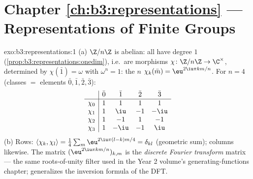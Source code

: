 \section*{Chapter \ref{ch:b3:representations} --- Representations
of Finite Groups}

\begin{solution}{exo:b3:representations:1}
(a) $\Z/n\Z$ is abelian: all  have degree $1$
(\cref{prop:b3:representations:onedim}), i.e.\ are morphisms
$\chi \colon \Z/n\Z \to \C^\times$, determined by $\chi(\bar 1)
= \omega$ with $\omega^n = 1$: the $n$  $\chi_k(\bar
m) = \eu^{2\iu\pi km/n}$. For $n = 4$ (classes $= $ elements
$\bar0,\bar1,\bar2,\bar3$):
\[
\begin{array}{c|cccc}
& \bar0 & \bar1 & \bar2 & \bar3\\
\hline
\chi_0 & 1 & 1 & 1 & 1\\
\chi_1 & 1 & \iu & -1 & -\iu\\
\chi_2 & 1 & -1 & 1 & -1\\
\chi_3 & 1 & -\iu & -1 & \iu
\end{array}
\]
(b) Rows: $\langle\chi_k,\chi_l\rangle = \frac14\sum_m
\eu^{2\iu\pi(l-k)m/4} = \delta_{kl}$ (geometric sum); columns
likewise. The matrix $(\eu^{2\iu\pi km/n})_{k,m}$ is the
\emph{discrete Fourier transform} matrix --- the same
roots-of-unity filter used in the Year 2 volume's
generating-functions chapter; 
generalizes the inversion formula of the DFT.
\end{solution}

